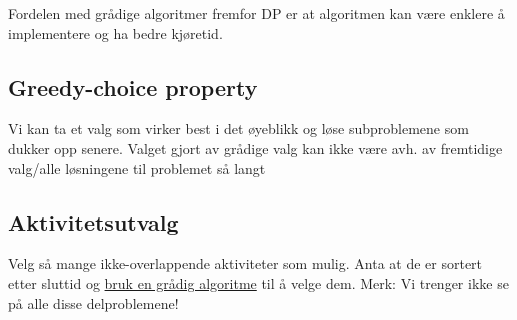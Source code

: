 \documentclass[12pt]{report}
\begin{document}
Fordelen med grådige algoritmer fremfor DP er at algoritmen kan være enklere å implementere og ha bedre kjøretid.\par


\vspace{\baselineskip}
\setlength{\parskip}{6.0pt}
\subsection*{Greedy-choice property}
\setlength{\parskip}{10.56pt}
Vi kan ta et valg som virker best i det øyeblikk og løse subproblemene som dukker opp senere. Valget gjort av grådige valg kan ikke være avh. av fremtidige valg/alle løsningene til problemet så langt\par


\vspace{\baselineskip}
\setlength{\parskip}{6.0pt}
\subsection*{Aktivitetsutvalg}
\setlength{\parskip}{10.56pt}
Velg så mange ikke-overlappende aktiviteter som mulig. Anta at de er sortert etter sluttid og \uline{bruk en grådig algoritme} til å velge dem. Merk: Vi trenger ikke se på alle disse delproblemene!\par
\end{document}
